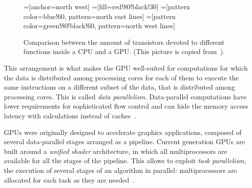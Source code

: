 \begin{figure}
  \centering
  =[anchor=north west]
  =[fill=red!80!black!30]
  =[pattern color=blue!60, pattern=north east lines]
  =[pattern color=green!80!black!60, pattern=north west lines]
  \label{fig:transistors}
  \caption[Comparison between CPU and GPU layout]{
    Comparison between the amount of transistors
    devoted to different functions inside a CPU and a GPU.
    (This picture is copied from~\cite[\S1]{cudaprog2}).
  }
\end{figure}

This arrangement is what makes the GPU
well-suited for computations
for which the data is distributed among processing cores
for each of them to execute the same instructions
on a different subset of the data,
that is distributed among processing cores.
This is called \emph{data parallelism}.
Data-parallel computations have lower requirements
for sophisticated flow control
and can hide the memory access latency with calculations
instead of caches~\cite[\S1.2]{cudaprog2}.

GPUs were originally designed to accelerate graphics applications,
composed of several data-parallel stages arranged as a pipeline.
Current generation GPUs are built around a \emph{unified shader} architecture,
in which all multiprocessors are available for all the stages of the pipeline.
This allows to exploit \emph{task parallelism},
the execution of several stages of an algorithm in parallel:
multiprocessors are allocated for each task as they are needed~\cite[\S{}II]{owens08}.

